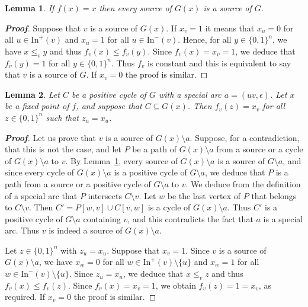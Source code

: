 \documentclass[11pt,a4paper]{article}
\newtheorem{lemma}{Lemma}
\def\B{\{0,1\}}
\def\In{\mathrm{In}}
\def\e{\epsilon}
\begin{document}
\begin{lemma}\label{source_lemma}
If $f(x)=x$ then every source of $G(x)$ is a source of $G$. 
\end{lemma}


\begin{proof}[{\bf Proof}]
Suppose that $v$ is a source of $G(x)$. If $x_v=1$ it means that $x_u=0$ for all $u\in \In^+(v)$ and $x_u=1$ for all $u\in \In^-(v)$. Hence, for all $y\in\B^n$, we have $x\leq_v y$ and thus $f_v(x)\leq f_v(y)$. Since $f_v(x)=x_v=1$, we deduce that $f_v(y)=1$ for all $y\in\B^n$. Thus $f_v$ is constant and this is equivalent to say that $v$ is a source of $G$. If $x_v=0$ the proof is similar.  
\end{proof}

\begin{lemma}\label{canalizing}
Let $C$ be a positive cycle of $G$ with a special arc $a=(uv,\e)$. Let $x$ be a fixed point of $f$, and suppose that $C\subseteq G(x)$. Then $f_v(z)=x_v$ for all $z\in\B^n$ such that $z_u=x_u$. 
\end{lemma}


\begin{proof}[{\bf Proof}]
Let us prove that $v$ is a source of $G(x)\setminus a$. Suppose, for a contradiction, that this is not the case, and let $P$ be a path of $G(x)\setminus a$ from a source or a cycle of $G(x)\setminus a$ to $v$. By Lemma~\ref{source_lemma}, every source of $G(x)\setminus a$ is a source of $G\setminus a$, and since every cycle of $G(x)\setminus a$ is a positive cycle of $G\setminus a$, we deduce that $P$ is a path from a source or a positive cycle of $G\setminus a$ to $v$. We deduce from the definition of a special arc that $P$ intersects $C\setminus v$. Let $w$ be the last vertex of $P$ that belongs to $C\setminus v$. Then $C'=P[w,v]\cup C[v,w]$ is a cycle of $G(x)\setminus a$. Thus $C'$ is a positive cycle of $G\setminus a$ containing $v$, and this contradicts the fact that $a$ is a special arc. Thus $v$ is indeed a source of $G(x)\setminus a$. 

\medskip
Let $z\in\B^n$ with $z_u=x_u$. Suppose that $x_v=1$. Since $v$ is a source of $G(x)\setminus a$, we have $x_w=0$ for all $w\in\In^+(v)\setminus\{u\}$ and $x_w=1$ for all $w\in\In^-(v)\setminus\{u\}$. Since $z_u=x_u$, we deduce that $x\leq_v z$ and thus $f_v(x)\leq f_v(z)$. Since $f_v(x)=x_v=1$, we obtain $f_v(z)=1=x_v$, as required. If $x_v=0$ the proof is similar.  
\end{proof}
\end{document}
